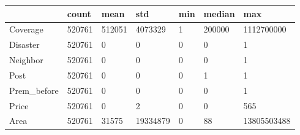 \begin{tabular}{lllllll}
\toprule
 & count & mean & std & min & median & max \\
\midrule
Coverage & 520761 & 512051 & 4073329 & 1 & 200000 & 1112700000 \\
Disaster & 520761 & 0 & 0 & 0 & 0 & 1 \\
Neighbor & 520761 & 0 & 0 & 0 & 0 & 1 \\
Post & 520761 & 0 & 0 & 0 & 1 & 1 \\
Prem\_before & 520761 & 0 & 0 & 0 & 0 & 1 \\
Price & 520761 & 0 & 2 & 0 & 0 & 565 \\
Area & 520761 & 31575 & 19334879 & 0 & 88 & 13805503488 \\
\bottomrule
\end{tabular}

